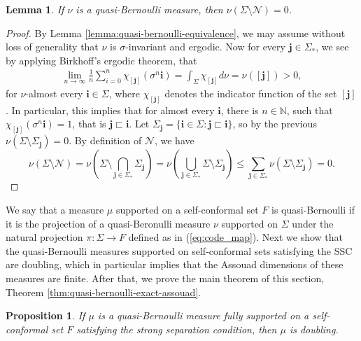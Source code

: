 \documentclass{PRM}
\newcommand{\field}[1]{\mathbb{#1}}
\newcommand{\N}{\field{N}}
\theoremstyle{plain}
\newtheorem{lemma}[thm]{Lemma}
\newtheorem{prop}[thm]{Proposition}
\theoremstyle{definition}
\theoremstyle{remark}
\begin{document}
\begin{lemma}\label{lemma:quasi-normal}
If $\nu$ is a quasi-Bernoulli measure, then $\nu(\Sigma\setminus\mathcal{N})=0$.
\end{lemma}
\begin{proof}
By Lemma \ref{lemma:quasi-bernoulli-equivalence}, we may assume without loss of generality that $\nu$ is $\sigma$-invariant and ergodic. Now for every $\mathbf{j}\in\Sigma_*$, we see by applying Birkhoff's ergodic theorem, that
\begin{align*}
    \lim_{n\to\infty}\frac{1}{n}\sum_{i=0}^{n}\chi_{[\mathbf{j}]}(\sigma^n\mathbf{i})=\int_{\Sigma}\chi_{[\mathbf{j}]}d\nu = \nu([\mathbf{j}])>0,
\end{align*}
for $\nu$-almost every $\mathbf{i}\in\Sigma$, where $\chi_{[\mathbf{j}]}$ denotes the indicator function of the set $[\mathbf{j}]$. In particular, this implies that for almost every $\mathbf{i}$, there is $n\in\N$, such that $\chi_{[\mathbf{j}]}(\sigma^n\mathbf{i})=1$, that is $\mathbf{j}\sqsubset\mathbf{i}$. Let $\Sigma_{\mathbf{j}}=\{\mathbf{i}\in\Sigma\colon \mathbf{j}\sqsubset\mathbf{i}\}$, so by the previous $\nu(\Sigma\setminus\Sigma_{\mathbf{j}})=0$. By definition of $\mathcal{N}$, we have
\begin{equation*}
    \nu(\Sigma\setminus\mathcal{N})=\nu\left(\Sigma\setminus\bigcap_{\mathbf{j}\in\Sigma_*}\Sigma_{\mathbf{j}}\right)=\nu\left(\bigcup_{\mathbf{j}\in\Sigma_*}\Sigma\setminus\Sigma_{\mathbf{j}}\right)\leq \sum_{\mathbf{j}\in\Sigma_*}\nu(\Sigma\setminus\Sigma_{\mathbf{j}})=0.
\end{equation*}
\end{proof}
We say that a measure $\mu$ supported on a self-conformal set $F$ is quasi-Bernoulli if it is the projection of a quasi-Beronulli measure $\nu$ supported on $\Sigma$ under the natural projection $\pi\colon\Sigma\to F$ defined as in (\ref{eq:code_map}). Next we show that the quasi-Bernoulli measures supported on self-conformal sets satisfying the SSC are doubling, which in particular implies that the Assouad dimensions of these measures are finite. After that, we prove the main theorem of this section, Theorem \ref{thm:quasi-bernoulli-exact-assouad}.
\begin{prop}\label{prop:doubling}
If $\mu$ is a quasi-Bernoulli measure fully supported on a self-conformal set $F$ satisfying the strong separation condition, then $\mu$ is doubling.
\end{prop}
\end{document}

